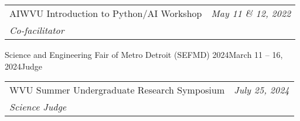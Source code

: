 \documentclass[letterpaper,11pt]{article}
\makeatletter
\newcommand{\resumeOrganizationHeading}[4]{
  \vspace{-2pt}\item
    \begin{tabular*}{0.97\textwidth}[t]{l@{\extracolsep{\fill}}r}
      {#1} & \textit{\small #2} \\
      \textit{\small#3}
    \end{tabular*}\vspace{-7pt}
}
\newcommand{\resumeSubHeadingListStart}{\begin{itemize}[leftmargin=0.15in, label={}]}
\newcommand{\resumeSubHeadingListEnd}{\end{itemize}}
\makeatother
\begin{document}
    \resumeOrganizationHeading
      {AIWVU Introduction to Python/AI Workshop}{May 11 \& 12, 2022}{Co-facilitator}

    \resumeOrganizationHeading
      {Science and Engineering Fair of Metro Detroit (SEFMD) 2024}{March 11 -- 16, 2024}{Judge}

    \resumeOrganizationHeading
      {WVU Summer Undergraduate Research Symposium}{July 25, 2024}{Science Judge}
    
  \resumeSubHeadingListEnd











\end{document}
